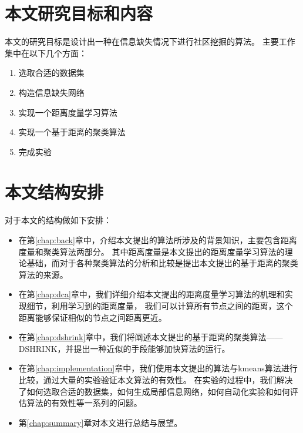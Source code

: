 \section{本文研究目标和内容}

本文的研究目标是设计出一种在信息缺失情况下进行社区挖掘的算法。
主要工作集中在以下几个方面：

\begin{enumerate}
\item 选取合适的数据集
\item 构造信息缺失网络
\item 实现一个距离度量学习算法
\item 实现一个基于距离的聚类算法
\item 完成实验
\end{enumerate}

\section{本文结构安排}

对于本文的结构做如下安排：

\begin{itemize}
    \item 在第\ref{chap:back}章中，介绍本文提出的算法所涉及的背景知识，主要包含距离度量和聚类算法两部分。
        其中距离度量是本文提出的距离度量学习算法的理论基础，而对于各种聚类算法的分析和比较是提出本文提出的基于距离的聚类算法的来源。
    \item 在第\ref{chap:dca}章中，我们详细介绍本文提出的距离度量学习算法的机理和实现细节，利用学习到的距离度量，
        我们可以计算所有节点之间的距离，这个距离能够保证相似的节点之间距离更近。
    \item 在第\ref{chap:dshrink}章中，我们将阐述本文提出的基于距离的聚类算法——DSHRINK，并提出一种近似的手段能够加快算法的运行。
    \item 在第\ref{chap:implementation}章中，我们使用本文提出的算法与kmeans算法进行比较，通过大量的实验验证本文算法的有效性。
    在实验的过程中，我们解决了如何选取合适的数据集，如何生成局部信息网络，如何自动化实验和如何评估算法的有效性等一系列的问题。
    \item 第\ref{chap:summary}章对本文进行总结与展望。
\end{itemize}
